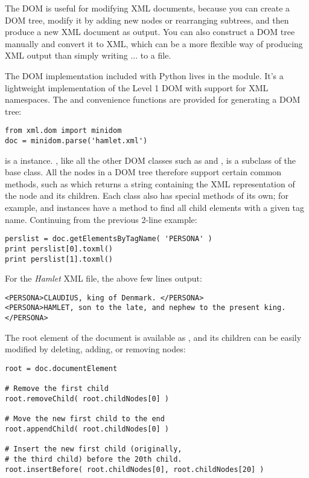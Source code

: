 \documentclass{howto}
\begin{document}
The DOM is useful for modifying XML documents, because you can create
a DOM tree, modify it by adding new nodes or rearranging subtrees, and
then produce a new XML document as output.  You can also construct a
DOM tree manually and convert it to XML, which can be a more flexible
way of producing XML output than simply writing
... to a file.

The DOM implementation included with Python lives in the
 module.  It's a lightweight implementation of
the Level 1 DOM with support for XML namespaces.  The 
 and  convenience
functions are provided for generating a DOM tree:

\begin{verbatim}
from xml.dom import minidom
doc = minidom.parse('hamlet.xml')
\end{verbatim}

 is a  instance.  , like all
the other DOM classes such as  and , is a
subclass of the  base class.  All the nodes in a DOM tree
therefore support certain common methods, such as 
which returns a string containing the XML representation of the node
and its children.  Each class also has special methods of its own; for
example,  and  instances have a method
to find all child elements with a given tag name.  Continuing from the
previous 2-line example:

\begin{verbatim}
perslist = doc.getElementsByTagName( 'PERSONA' )
print perslist[0].toxml()
print perslist[1].toxml()
\end{verbatim}

For the \textit{Hamlet} XML file, the above few lines output:

\begin{verbatim}
<PERSONA>CLAUDIUS, king of Denmark. </PERSONA>
<PERSONA>HAMLET, son to the late, and nephew to the present king.</PERSONA>
\end{verbatim}

The root element of the document is available as
, and its children can be easily modified
by deleting, adding, or removing nodes:

\begin{verbatim}
root = doc.documentElement

# Remove the first child
root.removeChild( root.childNodes[0] )

# Move the new first child to the end
root.appendChild( root.childNodes[0] )

# Insert the new first child (originally,
# the third child) before the 20th child.
root.insertBefore( root.childNodes[0], root.childNodes[20] )
\end{verbatim}
\end{document}
